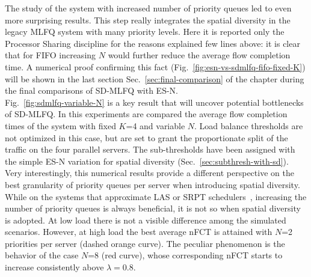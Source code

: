 The study of the system with increased number of priority queues led to even more surprising results. This step really integrates the spatial diversity in the legacy MLFQ system with many priority levels. Here it is reported only the Processor Sharing discipline for the reasons explained few lines above: it is clear that for FIFO increasing $N$ would further reduce the average flow completion time. A numerical proof confirming this fact (Fig.~\ref{fig:esn-vs-sdmlfq-fifo-fixed-K}) will be shown in the last section Sec.~\ref{sec:final-comparison} of the chapter during the final comparisons of SD-MLFQ with ES-N. \\
Fig.~\ref{fig:sdmlfq-variable-N} is a key result that will uncover potential bottlenecks of SD-MLFQ. In this experiments are compared the average flow completion times of the system with fixed $K$=4 and variable $N$. Load balance thresholds are not optimized in this case, but are set to grant the proportionate split of the traffic on the four parallel servers. The sub-thresholds have been assigned with the simple ES-N variation for spatial diversity (Sec.~\ref{sec:subthresh-with-sd}). Very interestingly, this numerical results provide a different perspective on the best granularity of priority queues per server when introducing spatial diversity. While on the systems that approximate LAS or SRPT schedulers~\cite{pias, pFabric}, increasing the number of priority queues is always beneficial, it is not so when spatial diversity is adopted. At low load there is not a visible difference among the simulated scenarios. However, at high load the best average nFCT is attained with $N$=2 priorities per server (dashed orange curve). The peculiar phenomenon is the behavior of the case $N$=8 (red curve), whose corresponding nFCT starts to increase consistently above $\lambda=0.8$. 
